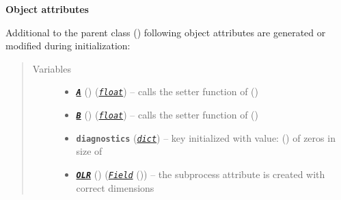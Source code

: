 \documentclass[a4paper,10pt,english]{sphinxmanual}
\begin{document}
\begin{fulllineitems}
\begin{quote}
\begin{description}
\begin{itemize}
\begin{itemize}
\end{itemize}


\end{itemize}

\end{description}\end{quote}

\textbf{Object attributes}

Additional to the parent class {\hyperref[api/climlab.process:climlab.process.energy_budget.EnergyBudget]{\emph{}}} ()
following object attributes are generated or modified during initialization:
\begin{quote}\begin{description}
\item[{Variables}] \leavevmode\begin{itemize}
\item {} 
{\hyperref[api/climlab.radiation:climlab.radiation.AplusBT.AplusBT.A]{\emph{\textbf{\texttt{A}}}}} () (\href{http://docs.python.org/2.7/library/functions.html\#float}{\emph{\texttt{float}}}) -- calls the setter function of {\hyperref[api/climlab.radiation:climlab.radiation.AplusBT.AplusBT.A]{\emph{}}} ()

\item {} 
{\hyperref[api/climlab.radiation:climlab.radiation.AplusBT.AplusBT.B]{\emph{\textbf{\texttt{B}}}}} () (\href{http://docs.python.org/2.7/library/functions.html\#float}{\emph{\texttt{float}}}) -- calls the setter function of {\hyperref[api/climlab.radiation:climlab.radiation.AplusBT.AplusBT.B]{\emph{}}} ()

\item {} 
\textbf{\texttt{diagnostics}} (\href{http://docs.python.org/2.7/library/stdtypes.html\#dict}{\emph{\texttt{dict}}}) -- key  initialized with value:
{\hyperref[api/climlab.domain:climlab.domain.field.Field]{\emph{}}} () of zeros
in size of 

\item {} 
{\hyperref[api/climlab.radiation:climlab.radiation.AplusBT.AplusBT.OLR]{\emph{\textbf{\texttt{OLR}}}}} () ({\hyperref[api/climlab.domain:climlab.domain.field.Field]{\emph{\emph{\texttt{Field}}}}} ()) -- the subprocess attribute  is
created with correct dimensions


\end{itemize}
\end{description}
\end{quote}
\end{fulllineitems}
\end{document}
